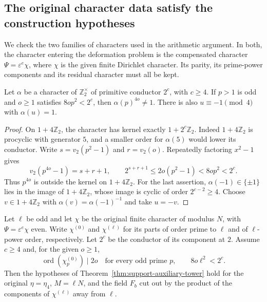 \subsection{The original character data satisfy the construction hypotheses}
\label{sec:support-auxiliary-admission}

We check the two families of characters used in the arithmetic
argument.  In both, the character entering the deformation problem
is the compensated character $\Psi=\varepsilon^e\chi$, where
$\chi$ is the given finite Dirichlet character.  Its parity, its
prime-power components and its residual character must all be kept.

\begin{lemma}
\label{lem:support-dyadic-character}
Let $\alpha$ be a character of $\mathbb Z_2^\times$ of primitive
conductor $2^c$, with $c\geq4$.  If $p>1$ is odd and $o\geq1$
satisfies $8op^2<2^c$, then $\alpha(p)^{4o}\ne1$.
There is also $u\equiv-1\pmod4$ with $\alpha(u)=1$.
\end{lemma}

\begin{proof}
On $1+4\mathbb Z_2$, the character has kernel exactly
$1+2^c\mathbb Z_2$.  Indeed $1+4\mathbb Z_2$ is procyclic
with generator $5$, and a smaller order for $\alpha(5)$
would lower its conductor.  Write
$s=v_2(p^2-1)$ and $r=v_2(o)$.  Repeatedly factoring
$x^2-1$ gives
\[
 v_2(p^{4o}-1)=s+r+1,
 \qquad 2^{s+r+1}\leq2o(p^2-1)<8op^2<2^c.
\]
Thus $p^{4o}$ is outside the kernel on $1+4\mathbb Z_2$.
For the last assertion, $\alpha(-1)\in\{\pm1\}$ lies in
the image of $1+4\mathbb Z_2$, whose image is cyclic of
order $2^{c-2}\geq4$.  Choose $v\in1+4\mathbb Z_2$ with
$\alpha(v)=\alpha(-1)^{-1}$ and take $u=-v$.
\end{proof}

\begin{proposition}
\label{prop:support-host-admission}
Let $\ell$ be odd and let $\chi$ be the original finite character
of modulus $N$, with $\Psi=\varepsilon^e\chi$ even.  Write
$\chi^{(0)}$ and $\chi^{(\ell)}$ for its parts of order
prime to $\ell$ and of $\ell$-power order, respectively.
Let $2^c$ be the conductor of its component at $2$.
Assume $c\geq4$ and, for the given $o\geq1$,
\[
  \operatorname{ord}(\chi^{(0)}_p)\mid2o\quad
       \text{for every odd prime }p,
  \qquad 8o\ell^2<2^c.                                   \tag{AA1}
\]
Then the hypotheses of Theorem~\ref{thm:support-auxiliary-tower}
hold for the original $\eta=\eta_4$, $M=\ell N$, and the
field $F_b$ cut out by the product of the components of
$\chi^{(\ell)}$ away from $\ell$.
\end{proposition}

